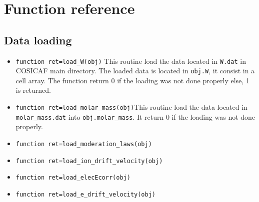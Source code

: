 \documentclass[10pt]{article}
\begin{document}
	
	\section{Function reference}
	
		\subsection{Data loading}
		
		\begin{itemize}
			\item \lstinline{function ret=load_W(obj)} This routine load the data located in \lstinline{W.dat} in COSICAF main directory. The loaded data is located in \lstinline{obj.W}, it consist in a cell array. The function return 0 if the loading was not done properly else, 1 is returned.
			
			\item \lstinline{function ret=load_molar_mass(obj)}This routine load the data located in \lstinline{molar_mass.dat} into \lstinline{obj.molar_mass}. It return 0 if the loading was not done properly.
			
			\item \lstinline{function ret=load_moderation_laws(obj)}
			\item \lstinline{function ret=load_ion_drift_velocity(obj)}
			\item \lstinline{function ret=load_elecEcorr(obj)}
		\item \lstinline{function ret=load_e_drift_velocity(obj)}
			
		\end{itemize}
		
\end{document}
